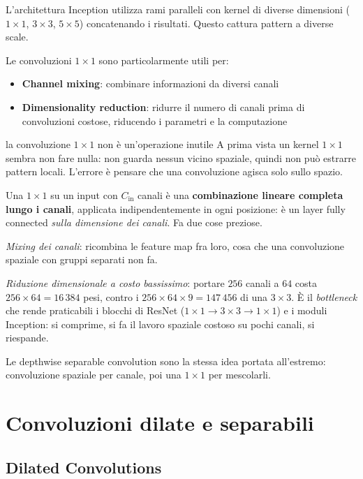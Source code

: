 L'architettura Inception utilizza rami paralleli con kernel di diverse dimensioni ($1 \times 1$, $3 \times 3$, $5 \times 5$) concatenando i risultati. Questo cattura pattern a diverse scale.

Le convoluzioni $1 \times 1$ sono particolarmente utili per:
\begin{itemize}
\item \textbf{Channel mixing}: combinare informazioni da diversi canali
\item \textbf{Dimensionality reduction}: ridurre il numero di canali prima di convoluzioni costose, riducendo i parametri e la computazione
\end{itemize}

\begin{trappola}{la convoluzione $1\times 1$ non è un'operazione inutile}
A prima vista un kernel $1\times 1$ sembra non fare nulla: non guarda nessun vicino spaziale, quindi non può estrarre pattern locali. L'errore è pensare che una convoluzione agisca solo sullo spazio.

Una $1\times 1$ su un input con $C_{\text{in}}$ canali è una \textbf{combinazione lineare completa lungo i canali}, applicata indipendentemente in ogni posizione: è un layer fully connected \emph{sulla dimensione dei canali}. Fa due cose preziose.

\emph{Mixing dei canali}: ricombina le feature map fra loro, cosa che una convoluzione spaziale con gruppi separati non fa.

\emph{Riduzione dimensionale a costo bassissimo}: portare $256$ canali a $64$ costa $256 \times 64 = 16\,384$ pesi, contro i $256 \times 64 \times 9 = 147\,456$ di una $3\times 3$. È il \emph{bottleneck} che rende praticabili i blocchi di ResNet ($1\times1 \to 3\times3 \to 1\times1$) e i moduli Inception: si comprime, si fa il lavoro spaziale costoso su pochi canali, si riespande.

Le depthwise separable convolution sono la stessa idea portata all'estremo: convoluzione spaziale per canale, poi una $1\times1$ per mescolarli.
\end{trappola}

\section{Convoluzioni dilate e separabili}

\subsection{Dilated Convolutions}

